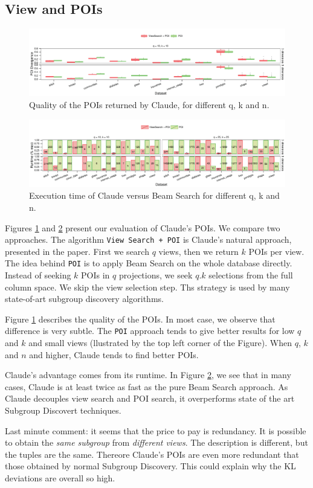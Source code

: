 \subsection{View and POIs}

\begin{figure}[t!]
\centering
\includegraphics[width=2\columnwidth]{plots/View-POI-Acc}
\caption{Quality of the POIs returned by Claude, for different q, k and n.}
\label{pic:quali-POIs}
\end{figure}
 
\begin{figure}[t!]
\centering
\includegraphics[width=2\columnwidth]{plots/View-POI-Time}
\caption{Execution time of Claude versus Beam Search for different q, k and n.} 
\label{pic:time-POIs}
\end{figure}

Figures \ref{pic:quali-POIs} and \ref{pic:time-POIs} present our evaluation of
Claude's POIs. We compare two approaches. The algorithm \texttt{View Search +
POI} is Claude's natural approach, presented in the paper. First we search $q$
views, then we return $k$ POIs per view. The idea behind \texttt{POI} is to
apply Beam Search on the whole database directly. Instead of seeking $k$ POIs
in $q$ projections, we seek $q.k$ selections from the full column space.  We
skip the view selection step. Ths strategy is used by many state-of-art
subgroup discovery algorithms. 

Figure \ref{pic:quali-POIs} describes the quality of the POIs. In most case, we
observe that difference is very subtle. The \texttt{POI} approach tends to give
better results for low $q$ and $k$ and small views (llustrated by the top left
corner of the Figure). When $q$, $k$ and $n$ and higher, Claude tends to find
better POIs.

Claude's advantage comes from its runtime. In Figure \ref{pic:time-POIs}, we
see that in many cases, Claude is at least twice as fast as the pure Beam
Search approach. As Claude decouples view search and POI search, it
overperforms state of the art Subgroup Discovert techniques.

Last minute comment: it seems that the price to pay is redundancy. It is
possible to obtain the \emph{same subgroup} from \emph{different views}. The
description is different, but the tuples are the same. Thereore Claude's POIs
are even more redundant that those obtained by normal Subgroup Discovery.  This
could explain why the KL deviations are overall so high.
